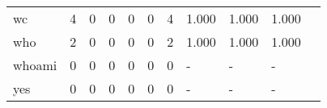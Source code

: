 \begin{longtable}{lp{1.2cm}p{1.2cm}p{1.2cm}p{1.2cm}p{1.2cm}p{1.2cm}p{1.2cm}p{1.2cm}p{1.2cm}p{1.2cm}}
wc        &                                     4 &                                                  0 &                                                  0 &                                                  0 &                                                  0 &                                                  4 &                                              1.000 &                                              1.000 &                                              1.000 \\
who       &                                     2 &                                                  0 &                                                  0 &                                                  0 &                                                  0 &                                                  2 &                                              1.000 &                                              1.000 &                                              1.000 \\
whoami    &                                     0 &                                                  0 &                                                  0 &                                                  0 &                                                  0 &                                                  0 &                                                  - &                                                  - &                                                  - \\
yes       &                                     0 &                                                  0 &                                                  0 &                                                  0 &                                                  0 &                                                  0 &                                                  - &                                                  - &                                                  - \\
\end{longtable}

